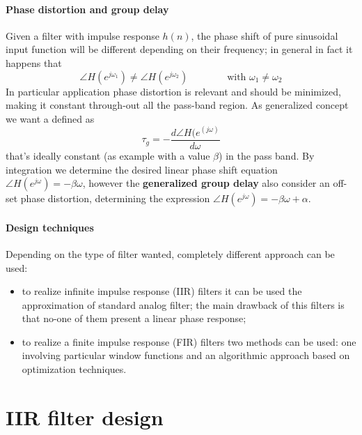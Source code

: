 	\paragraph{Phase distortion and group delay} Given a filter with impulse response $h(n)$, the phase shift of pure sinusoidal input function will be different depending on their frequency; in general in fact it happens that
	\[ \angle H(e^{j\omega_1}) \neq \angle H(e^{j\omega_2}) \qquad \qquad \textrm{with } \omega_1 \neq \omega_2 \]
	In particular application phase distortion is relevant and should be minimized, making it constant through-out all the pass-band region. As generalized concept we want a  defined as
	\begin{equation}
		\tau_g = -\frac{d\angle H(e^{(j\omega)}}{d\omega}
	\end{equation}
	that's ideally constant (as example with a value $\beta$) in the pass band. By integration we determine the desired linear phase shift equation $\angle H(e^{j\omega}) = - \beta \omega$, however the \textbf{generalized group delay} also consider an off-set phase distortion, determining the expression $\angle H(e^{j\omega}) = -\beta \omega + \alpha$.
	
	\paragraph{Design techniques} Depending on the type of filter wanted, completely different approach can be used:
	\begin{itemize}
		\item to realize infinite impulse response (IIR) filters it can be used the approximation of standard analog filter; the main drawback of this filters is that no-one of them present a linear phase response;
		
		\item to realize a finite impulse response (FIR) filters two methods can be used: one involving particular window functions and an algorithmic approach based on optimization techniques.
	\end{itemize}

\section{IIR filter design} \label{sec:filt:IIR}

